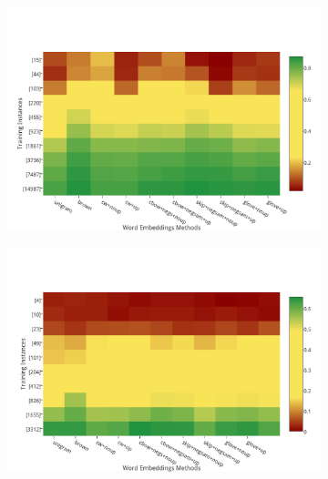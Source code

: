 \begin{figure}
\begin{subfigure}{7cm}
	\centering
    \includegraphics[scale=0.4]{plots/map-ner-color}    	
\end{subfigure}
\begin{subfigure}{7cm}
	\centering
    \includegraphics[scale=0.4]{plots/map-mwe-color}
\end{subfigure}
\label{fig:bestPOS-Chunk}
\end{figure}



